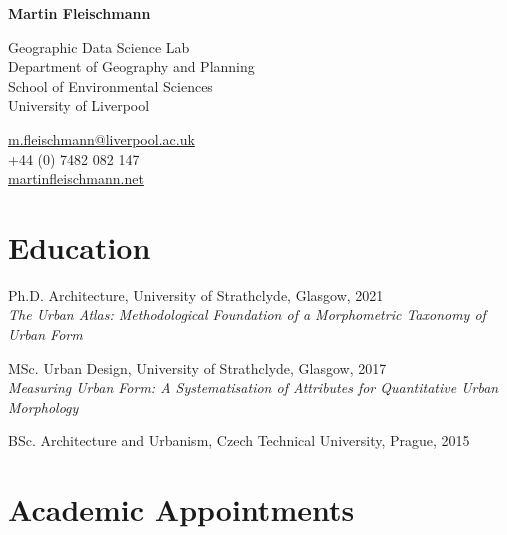 \documentclass[12pt,a4paper]{report}
\newcommand{\myname}{Martin Fleischmann}
\newcommand{\namefont}[1]{{\normalfont\bfseries\Huge{#1}}}
\begin{document}
    \raggedright{}

    \namefont{\myname}

    \vspace{1em}
    \begin{minipage}[t]{0.700\textwidth}
        Geographic Data Science Lab \\
        Department of Geography and Planning \\
        School of Environmental Sciences \\
        University of Liverpool
    \end{minipage}
    \begin{minipage}[t]{0.295\textwidth}
        \flushright{}
        \href{mailto:m.fleischmann@liverpool.ac.uk}{m.fleischmann@liverpool.ac.uk} \\
        +44 (0) 7482 082 147 \\
        \href{https://martinfleischmann.net}{martinfleischmann.net}
    \end{minipage}


    \section*{Education}

    \begin{tablist}

        \item[Ph.D.] \tab{}Architecture, University of Strathclyde, Glasgow, 2021 \\
                           \textit{The Urban Atlas: Methodological Foundation of a Morphometric Taxonomy of Urban Form}
        \item[MSc.]  \tab{}Urban Design, University of Strathclyde, Glasgow, 2017 \\
                           \textit{Measuring Urban Form: A Systematisation of Attributes for Quantitative Urban Morphology}
        \item[BSc.]  \tab{}Architecture and Urbanism, Czech Technical University, Prague, 2015

    \end{tablist}


    \section*{Academic Appointments}
\end{document}
